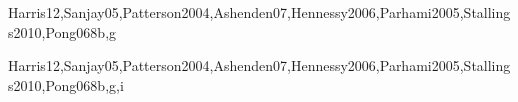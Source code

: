 \begin{syllabus}
\begin{unit}{\ARMemorysystemorganizationandarchitecture}{}{Harris12,Sanjay05,Patterson2004,Ashenden07,Hennessy2006,Parhami2005,Stallings2010,Pong06}{8}{b,g}
\begin{topics}
  \item \ARMemorysystemorganizationandarchitectureTopicStorage
  \item \ARMemorysystemorganizationandarchitectureTopicMemory
  \item \ARMemorysystemorganizationandarchitectureTopicMain
  \item \ARMemorysystemorganizationandarchitectureTopicLatency
  \item \ARMemorysystemorganizationandarchitectureTopicCache
  \item \ARMemorysystemorganizationandarchitectureTopicMultiprocessor
  \item \ARMemorysystemorganizationandarchitectureTopicVirtual
  \item \ARMemorysystemorganizationandarchitectureTopicFault
  \item \ARMemorysystemorganizationandarchitectureTopicError
\end{topics}

\begin{learningoutcomes}
  \item \ARMemorysystemorganizationandarchitectureLOIdentify [\Familiarity]
  \item \ARMemorysystemorganizationandarchitectureLOExplainTheMemory [\Familiarity]
  \item \ARMemorysystemorganizationandarchitectureLODescribeHowOf [\Usage]
  \item \ARMemorysystemorganizationandarchitectureLODescribeTheMemory [\Usage] 
  \item \ARMemorysystemorganizationandarchitectureLOExplainTheA [\Usage] 
  \item \ARMemorysystemorganizationandarchitectureLOCompute [\Assessment]
\end{learningoutcomes}
\end{unit}

\begin{unit}{\ARInterfacingandcommunication}{}{Harris12,Sanjay05,Patterson2004,Ashenden07,Hennessy2006,Parhami2005,Stallings2010,Pong06}{8}{b,g,i}
\begin{topics}
	\item \ARInterfacingandcommunicationTopicI
	\item \ARInterfacingandcommunicationTopicInterrupt
	\item \ARInterfacingandcommunicationTopicExternal
	\item \ARInterfacingandcommunicationTopicBuses
	\item \ARInterfacingandcommunicationTopicIntroduction
	\item \ARInterfacingandcommunicationTopicMultimedia
	\item \ARInterfacingandcommunicationTopicRaid
 \end{topics}
 

\end{unit}
\end{syllabus}
